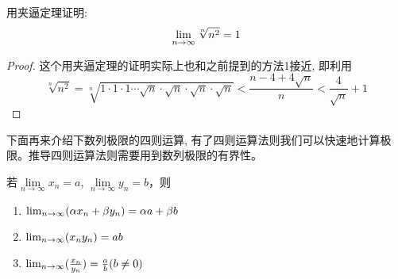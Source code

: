 \begin{example}
    用夹逼定理证明:
    \begin{equation*}
        \lim_{n \to \infty } \sqrt[n]{n^2} = 1
    \end{equation*}
\end{example}
\begin{proof}
    这个用夹逼定理的证明实际上也和之前提到的方法1接近, 即利用
    \begin{equation*}
        \sqrt[n]{n^2} = \sqrt[n]{1\cdot1\cdot1\cdots\sqrt{n}\cdot\sqrt{n}\cdot\sqrt{n}\cdot\sqrt{n}} <\frac{n-4+4\sqrt{n}}{n} < \frac{4}{\sqrt{n}} + 1
    \end{equation*}
\end{proof}
下面再来介绍下数列极限的四则运算, 有了四则运算法则我们可以快速地计算极限。推导四则运算法则需要用到数列极限的有界性。
\begin{theorem}[数列极限的四则运算]
    若$\lim\limits_{n \to \infty} x_n = a$, $\lim\limits_{n \to \infty} y_n = b$，则
    \begin{enumerate}
        \item $\lim_{n \to \infty } (\alpha x_n + \beta y_n) = \alpha a + \beta b$
        \item $\lim_{n \to \infty } (x_n y_n) = ab$
        \item $\lim_{n \to \infty } (\frac{x_n}{y_n}) = \frac{a}{b}(b \neq 0)$
    \end{enumerate}
\end{theorem}
